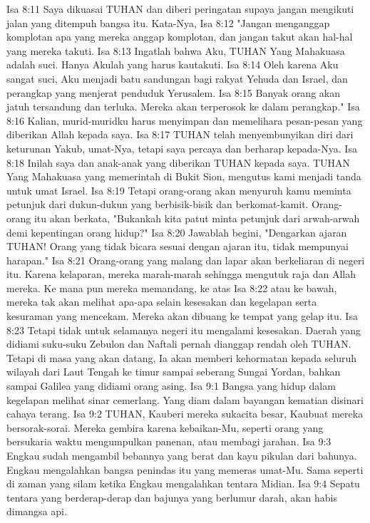 Isa 8:11  Saya dikuasai TUHAN dan diberi peringatan supaya jangan mengikuti jalan yang ditempuh bangsa itu. Kata-Nya,
Isa 8:12  "Jangan menganggap komplotan apa yang mereka anggap komplotan, dan jangan takut akan hal-hal yang mereka takuti.
Isa 8:13  Ingatlah bahwa Aku, TUHAN Yang Mahakuasa adalah suci. Hanya Akulah yang harus kautakuti.
Isa 8:14  Oleh karena Aku sangat suci, Aku menjadi batu sandungan bagi rakyat Yehuda dan Israel, dan perangkap yang menjerat penduduk Yerusalem.
Isa 8:15  Banyak orang akan jatuh tersandung dan terluka. Mereka akan terperosok ke dalam perangkap."
Isa 8:16  Kalian, murid-muridku harus menyimpan dan memelihara pesan-pesan yang diberikan Allah kepada saya.
Isa 8:17  TUHAN telah menyembunyikan diri dari keturunan Yakub, umat-Nya, tetapi saya percaya dan berharap kepada-Nya.
Isa 8:18  Inilah saya dan anak-anak yang diberikan TUHAN kepada saya. TUHAN Yang Mahakuasa yang memerintah di Bukit Sion, mengutus kami menjadi tanda untuk umat Israel.
Isa 8:19  Tetapi orang-orang akan menyuruh kamu meminta petunjuk dari dukun-dukun yang berbisik-bisik dan berkomat-kamit. Orang-orang itu akan berkata, "Bukankah kita patut minta petunjuk dari arwah-arwah demi kepentingan orang hidup?"
Isa 8:20  Jawablah begini, "Dengarkan ajaran TUHAN! Orang yang tidak bicara sesuai dengan ajaran itu, tidak mempunyai harapan."
Isa 8:21  Orang-orang yang malang dan lapar akan berkeliaran di negeri itu. Karena kelaparan, mereka marah-marah sehingga mengutuk raja dan Allah mereka. Ke mana pun mereka memandang, ke atas
Isa 8:22  atau ke bawah, mereka tak akan melihat apa-apa selain kesesakan dan kegelapan serta kesuraman yang mencekam. Mereka akan dibuang ke tempat yang gelap itu.
Isa 8:23  Tetapi tidak untuk selamanya negeri itu mengalami kesesakan. Daerah yang didiami suku-suku Zebulon dan Naftali pernah dianggap rendah oleh TUHAN. Tetapi di masa yang akan datang, Ia akan memberi kehormatan kepada seluruh wilayah dari Laut Tengah ke timur sampai seberang Sungai Yordan, bahkan sampai Galilea yang didiami orang asing.
Isa 9:1  Bangsa yang hidup dalam kegelapan melihat sinar cemerlang. Yang diam dalam bayangan kematian disinari cahaya terang.
Isa 9:2  TUHAN, Kauberi mereka sukacita besar, Kaubuat mereka bersorak-sorai. Mereka gembira karena kebaikan-Mu, seperti orang yang bersukaria waktu mengumpulkan panenan, atau membagi jarahan.
Isa 9:3  Engkau sudah mengambil bebannya yang berat dan kayu pikulan dari bahunya. Engkau mengalahkan bangsa penindas itu yang memeras umat-Mu. Sama seperti di zaman yang silam ketika Engkau mengalahkan tentara Midian.
Isa 9:4  Sepatu tentara yang berderap-derap dan bajunya yang berlumur darah, akan habis dimangsa api.
